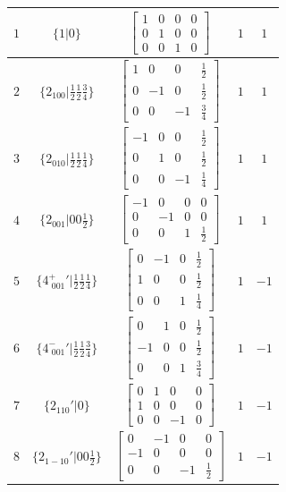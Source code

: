 \documentclass[fleqn,8pt]{jsarticle}
\begin{document}
\begin{longtable}{ccccc}
$ 1 $ & $ \{1|0\} $ & $ \begin{bmatrix} 1 & 0 & 0 & 0 \\ 0 & 1 & 0 & 0 \\ 0 & 0 & 1 & 0 \end{bmatrix} $ & $ 1 $ & $ 1 $ \\ \hline
$ 2 $ & $ \{2{}_{100}|\frac{1}{2} \frac{1}{2} \frac{3}{4}\} $ & $ \begin{bmatrix} 1 & 0 & 0 & \frac{1}{2} \\ 0 & -1 & 0 & \frac{1}{2} \\ 0 & 0 & -1 & \frac{3}{4} \end{bmatrix} $ & $ 1 $ & $ 1 $ \\ \hline
$ 3 $ & $ \{2{}_{010}|\frac{1}{2} \frac{1}{2} \frac{1}{4}\} $ & $ \begin{bmatrix} -1 & 0 & 0 & \frac{1}{2} \\ 0 & 1 & 0 & \frac{1}{2} \\ 0 & 0 & -1 & \frac{1}{4} \end{bmatrix} $ & $ 1 $ & $ 1 $ \\ \hline
$ 4 $ & $ \{2{}_{001}|0 0 \frac{1}{2}\} $ & $ \begin{bmatrix} -1 & 0 & 0 & 0 \\ 0 & -1 & 0 & 0 \\ 0 & 0 & 1 & \frac{1}{2} \end{bmatrix} $ & $ 1 $ & $ 1 $ \\ \hline
$ 5 $ & $ \{4^{+}_{\,\,001}{}'|\frac{1}{2} \frac{1}{2} \frac{1}{4}\} $ & $ \begin{bmatrix} 0 & -1 & 0 & \frac{1}{2} \\ 1 & 0 & 0 & \frac{1}{2} \\ 0 & 0 & 1 & \frac{1}{4} \end{bmatrix} $ & $ 1 $ & $ -1 $ \\ \hline
$ 6 $ & $ \{4^{-}_{\,\,001}{}'|\frac{1}{2} \frac{1}{2} \frac{3}{4}\} $ & $ \begin{bmatrix} 0 & 1 & 0 & \frac{1}{2} \\ -1 & 0 & 0 & \frac{1}{2} \\ 0 & 0 & 1 & \frac{3}{4} \end{bmatrix} $ & $ 1 $ & $ -1 $ \\ \hline
$ 7 $ & $ \{2{}_{110}{}'|0\} $ & $ \begin{bmatrix} 0 & 1 & 0 & 0 \\ 1 & 0 & 0 & 0 \\ 0 & 0 & -1 & 0 \end{bmatrix} $ & $ 1 $ & $ -1 $ \\ \hline
$ 8 $ & $ \{2{}_{1-10}{}'|0 0 \frac{1}{2}\} $ & $ \begin{bmatrix} 0 & -1 & 0 & 0 \\ -1 & 0 & 0 & 0 \\ 0 & 0 & -1 & \frac{1}{2} \end{bmatrix} $ & $ 1 $ & $ -1 $ \\
\end{longtable}
\end{document}
